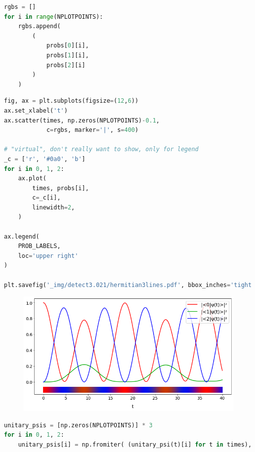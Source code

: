 \begin{lstlisting}[language=Python]
rgbs = []
for i in range(NPLOTPOINTS):
    rgbs.append(
        (
            probs[0][i],
            probs[1][i],
            probs[2][i]
        )
    )
\end{lstlisting}

\begin{lstlisting}[language=Python]
fig, ax = plt.subplots(figsize=(12,6))
ax.set_xlabel('t')
ax.scatter(times, np.zeros(NPLOTPOINTS)-0.1,
            c=rgbs, marker='|', s=400)

# "virtual", don't really want to show, only for legend
_c = ['r', '#0a0', 'b']
for i in 0, 1, 2:
    ax.plot(
        times, probs[i],
        c=_c[i],
        linewidth=2,
    )

ax.legend(
    PROB_LABELS,
    loc='upper right'
)

plt.savefig('_img/detect3.021/hermitian3lines.pdf', bbox_inches='tight', pad_inches=0)
\end{lstlisting}

\begin{figure}[h!]
\centering
\includegraphics[width=0.66\linewidth]{tex/appendix/nb/jupyter/3lev/output_22_0.png}

\end{figure}

\begin{lstlisting}[language=Python]
unitary_psis = [np.zeros(NPLOTPOINTS)] * 3
for i in 0, 1, 2:
    unitary_psis[i] = np.fromiter( (unitary_psi(t)[i] for t in times), np.complex )
\end{lstlisting}


